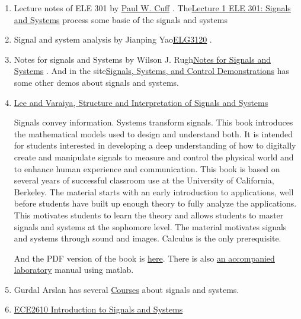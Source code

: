 \documentclass[koma,utopia,letterpaper,captions=tableheading,11pt,listings-sv,microtype,paralist,colorlinks=true,urlcolor=blue]{org-article}
\begin{document}
\begin{enumerate}
\item Lecture notes of ELE 301 by \href{https://www.princeton.edu/\~cuff/}{Paul W. Cuff} . The\href{https://www.princeton.edu/\~cuff/ele301/files/lecture1\_2.pdf}{Lecture 1 ELE 301: Signals and
Systems}  process some basic of the signals and systems

\item Signal and system analysis by Jianping Yao\href{http://www.site.uottawa.ca/\~jpyao/courses/E3125B\_Fall\_2019.html}{ELG3120} .

\item Notes for signals and Systems by Wilson J. Rugh\href{https://pages.jh.edu/\~bcooper8/sigma\_files/courses/214/signalsandsystemsnotes.pdf}{Notes for Signals and Systems}
. And in the site\href{https://pages.jh.edu/\~signals/}{Signals, Systems, and Control Demonstrations} has some other
demos about signals and systems.

\item \href{https://ptolemy.berkeley.edu/books/leevaraiya/}{Lee and Varaiya, Structure and Interpretation of Signals and Systems}

Signals convey information. Systems transform signals. This book introduces
the mathematical models used to design and understand both. It is intended
for students interested in developing a deep understanding of how to
digitally create and manipulate signals to measure and control the physical
world and to enhance human experience and communication. This book is based
on several years of successful classroom use at the University of California,
Berkeley. The material starts with an early introduction to applications,
well before students have built up enough theory to fully analyze the
applications. This motivates students to learn the theory and allows students
to master signals and systems at the sophomore level. The material motivates
signals and systems through sound and images. Calculus is the only
prerequisite.

 And the PDF version of the book is \href{https://ptolemy.berkeley.edu/books/leevaraiya/releases/LeeVaraiya\_DigitalV2\_04.pdf}{here}. There is also \href{https://ptolemy.berkeley.edu/books/leevaraiya/releases/LabManualV1\_AddisonWesley.pdf}{an accompanied
laboratory} manual using matlab.

\item Gurdal Arslan has several \href{http://www2.hawaii.edu/\~gurdal/index\_files/Page386.htm}{Courses} about signals and systems.

\item \href{http://www.eas.uccs.edu/\~mwickert/ece2610/}{ECE2610 Introduction to Signals and Systems}


\end{enumerate}
\end{document}
